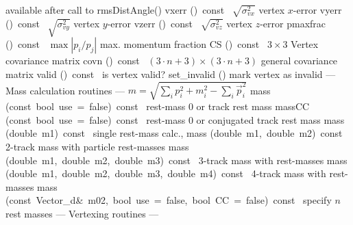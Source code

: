 \documentclass{article}
\begin{document}
\begin{cxxentry}
\begin{cxxclass}
\begin{cxxpublic}
        { available after call to rmsDistAngle()}
        {}
\label{cxx.1.2.31}
        {vxerr}
        {()\ const\ }
        { $\sqrt{\sigma_{vx}^2}$ vertex $x$-error}
        {}
\label{cxx.1.2.32}
        {vyerr}
        {()\ const\ }
        { $\sqrt{\sigma_{vy}^2}$ vertex $y$-error}
        {}
\label{cxx.1.2.33}
        {vzerr}
        {()\ const\ }
        { $\sqrt{\sigma_{vz}^2}$ vertex $z$-error}
        {}
\label{cxx.1.2.34}
        {pmaxfrac}
        {()\ const\ }
        { $\max|p_i/p_j|$ max. momentum fraction}
        {}
\label{cxx.1.2.35}
        {CS}
        {()\ const\ }
        { $3\times3$ Vertex covariance matrix}
        {}
\label{cxx.1.2.36}
        {covn}
        {()\ const\ }
        { $(3\cdot n+3)\times(3\cdot n+3)$ general covariance matrix}
        {}
\label{cxx.1.2.37}
        {valid}
        {()\ const\ }
        { is vertex valid?}
        {}
\label{cxx.1.2.38}
        {set\_invalid}
        {()}
        { mark vertex as invalid}
        {}
\label{cxx.1.2.39}
\cxxitem{}
        {--- Mass calculation routines ---}
        {}
        {$m = \sqrt{\sum_i p_i^2 + m_i^2 - \sum_i \vec{p}_i^2}$}
        {}
\label{cxx.1.2.40}
        {mass}
        {(const\ bool\ use\ =\ false)\ const\ }
        { rest-mass 0 or track rest mass}
        {}
\label{cxx.1.2.41}
        {massCC}
        {(const\ bool\ use\ =\ false)\ const\ }
        { rest-mass 0 or conjugated track rest mass}
        {}
\label{cxx.1.2.42}
        {mass}
        {(double\ m1)\ const\ }
        { single rest-mass calc.,}
        {}
\label{cxx.1.2.43}
        {mass}
        {(double\ m1,\ double\ m2)\ const\ }
        { 2-track mass with particle rest-masses}
        {}
\label{cxx.1.2.44}
        {mass}
        {(double\ m1,\ double\ m2,\ double\ m3)\ const\ }
        { 3-track mass with rest-masses}
        {}
\label{cxx.1.2.45}
        {mass}
        {(double\ m1,\ double\ m2,\ double\ m3,\ double\ m4)\ const\ }
        { 4-track mass with rest-masses}
        {}
\label{cxx.1.2.46}
        {mass}
        {(const\ Vector\_d\&\ m02,\ bool\ use\ =\ false,\ bool\ CC\ =\ false)\ const\ }
        { specify $n$ rest masses}
        {}
\label{cxx.1.2.47}
\cxxitem{}
        {--- Vertexing routines --- }
        {}
        {}
        {}
\label{cxx.1.2.48}

\end{cxxpublic}
\end{cxxclass}
\end{cxxentry}
\end{document}

